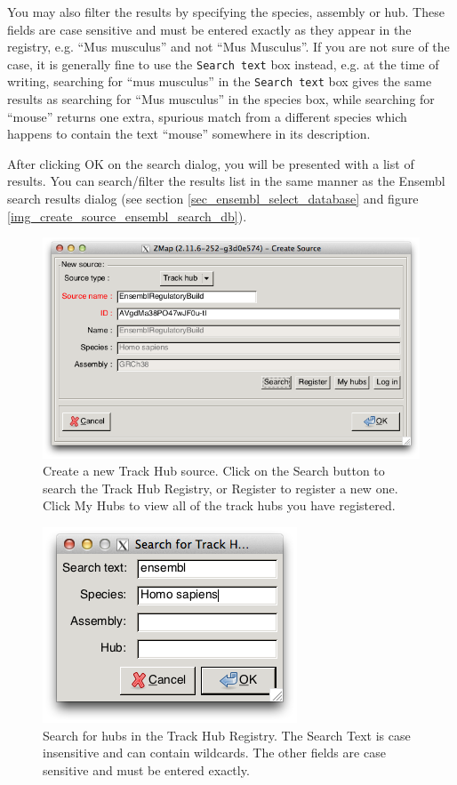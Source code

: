 \documentclass[letterpaper]{article}
\begin{document}
You may also filter the results by specifying the species, assembly or hub. These fields are case sensitive and must be entered exactly as they appear in the registry, e.g. ``Mus musculus'' and not ``Mus Musculus''. If you are not sure of the case, it is generally fine to use the \lstinline{Search text} box instead, e.g. at the time of writing, searching for ``mus musculus'' in the \lstinline{Search text} box gives the same results as searching for ``Mus musculus'' in the species box, while searching for ``mouse'' returns one extra, spurious match from a different species which happens to contain the text ``mouse'' somewhere in its description.

After clicking OK on the search dialog, you will be presented with a list of results. You can search/filter the results list in the same manner as the Ensembl search results dialog (see section \ref{sec_ensembl_select_database} and figure \ref{img_create_source_ensembl_search_db}).

\begin{figure}
\centering
\color[rgb]{0.30980393,0.5058824,0.7411765}
\includegraphics[resolution=150]{images/create_source_trackhub.png}
\caption{Create a new Track Hub source. Click on the Search button to search the Track Hub Registry, or Register to register a new one. Click My Hubs to view all of the track hubs you have registered.}
\label{img_create_source_trackhub}
\end{figure}

\begin{figure}
\centering
\color[rgb]{0.30980393,0.5058824,0.7411765}
\includegraphics[resolution=150]{images/create_source_trackhub_search.png}
\caption{Search for hubs in the Track Hub Registry. The Search Text is case insensitive and can contain wildcards. The other fields are case sensitive and must be entered exactly.}
\label{img_create_source_trackhub_search}
\end{figure}
\end{document}
